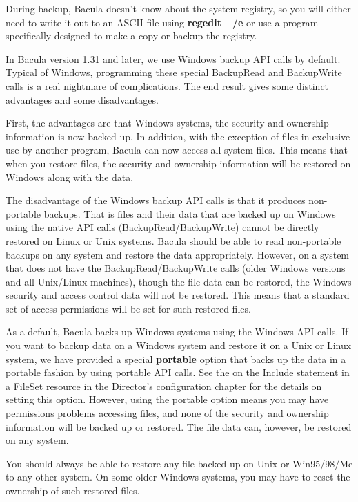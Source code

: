 During backup, Bacula doesn't know about the system registry, so you will
either need to write it out to an ASCII file using {\bf regedit~~/e} or use a
program specifically designed to make a copy or backup the registry. 

In Bacula version 1.31 and later, we use Windows backup API calls by
default.  Typical of Windows, programming these special BackupRead and
BackupWrite calls is a real nightmare of complications.  The end result
gives some distinct advantages and some disadvantages.

First, the advantages are that Windows systems, the security and
ownership information is now backed up.  In addition, with the exception of
files in exclusive use by another program, Bacula can now access all system
files.  This means that when you restore files, the security and ownership
information will be restored on Windows along with the data.

The disadvantage of the Windows backup API calls is that it produces
non-portable backups.  That is files and their data that are backed up on
Windows using the native API calls (BackupRead/BackupWrite) cannot be
directly restored on Linux or Unix systems.  Bacula should be able to read
non-portable backups on any system and restore the data appropriately.
However, on a system that does not have the BackupRead/BackupWrite calls
(older Windows versions and all Unix/Linux machines), though the file data
can be restored, the Windows security and access control data will not be
restored.  This means that a standard set of access permissions will be set
for such restored files.
        

As a default, Bacula backs up Windows systems using the Windows API calls.
If you want to backup data on a Windows system and restore it on a
Unix or Linux system, we have provided a special {\bf portable} option
that backs up the data in a portable fashion by using portable API calls.
See the  on the Include statement in a
FileSet resource in the Director's configuration chapter for the details on
setting this option.  However, using the portable option means you may have
permissions problems accessing files, and none of the security and
ownership information will be backed up or restored.  The file data can,
however, be restored on any system.

You should always be able to restore any file backed up on Unix or Win95/98/Me
to any other system. On some older Windows systems, you may have to
reset the ownership of such restored files. 

